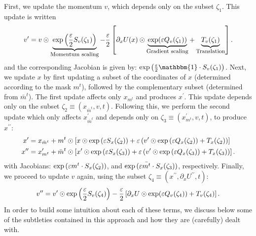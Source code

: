 \documentclass[../main.tex]{subfiles}
\begin{document}
First, we update the momentum $v$, which depends only on the subset $\zeta_1$.
%
This update is written
%
\begin{equation}
  \vp = v \odot 
    \underbrace{\exp\left(\frac{\varepsilon}{2}
    S_{v}(\zeta_1)\right)}_{\text{\footnotesize{Momentum scaling}}}%
    - \frac{\varepsilon}{2}\left[\partial_{x} U(x)%
      \odot\underbrace{\exp(\varepsilon
      Q_{v}(\zeta_1))}_{\text{\footnotesize{Gradient scaling}}}%
    + \underbrace{T_v(\zeta_1)}_{\text{\footnotesize{Translation}}}\right].
    \label{eq:update_momentum_forward1}
\end{equation}
%
and the corresponding Jacobian is given by:
$\exp{\left(\frac{\eps}{2}\mathbbm{1} \cdot S_{v}(\zeta_1)\right)}$.
%
Next, we update $x$ by first updating a subset of the coordinates of $x$
(determined according to the mask $m^t$), followed by the complementary subset
(determined from $\bar m^{t}$).
%
The first update affects only $x_{m^{t}}$ and produces $x^{\prime}$.
%
This update depends only on the subset $\zeta_2 \equiv (x_{\bar m^t}, v, t)$.
%
Following this, we perform the second update which only affects
$x_{\bar{m}^t}^{\prime}$ and depends only on $\zeta_3 \equiv (x_{m^t}^{\prime},
v, t)$, to produce $x^{\prime\prime}$:
%
\begin{align}
  x^{\prime} &= x_{\bar{m}^t} + m^{t}\odot\left[x \odot \exp{(\eps
      S_x(\zeta_2))} + \eps\left(v^{\prime}\odot%
    \exp{(\eps Q_x(\zeta_2))} + T_x(\zeta_2)\right)\right]\\
  x^{\prime\prime} &= x^{\prime}_{m^t} + \bar m^t \odot \left[x^{\prime} \odot
    \exp{(\eps S_x(\zeta_3))} +%
    \eps\left(v^{\prime} \odot \exp{(\eps Q_x(\zeta_3))} +
  T_x(\zeta_3)\right)\right].
\end{align}
%
with Jacobians: $\exp{({\varepsilon}m^{t} \cdot S_x(\zeta_2))}$, and
$\exp{({\varepsilon}\bar{m^t}\cdot S_x(\zeta_3))}$, respectively. 
%
Finally, we proceed to update $v$ again, using the subset $\zeta_4 \equiv
(x^{\prime\prime}, \partial_{x} U^{\prime\prime}, t)$: 
%
\begin{equation} 
  {v^{\prime\prime}} = {v^{\prime}} \odot \exp\left(\frac{\varepsilon}{2} S_v(\zeta_4)\right) -
    \frac{\varepsilon}{2}\left[\partial_{x} U
  \odot \exp(\varepsilon Q_v(\zeta_4)) + T_v(\zeta_4)\right].
    \label{eq:update_momentum_forward2}
\end{equation}
%
In order to build some intuition about each of these terms, we discuss below
some of the subtleties contained in this approach and how they are (carefully)
dealt with.
\end{document}
